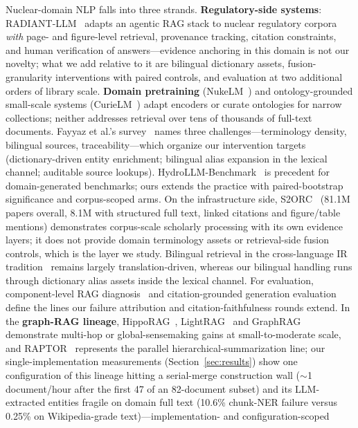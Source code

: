 \documentclass[sigconf,nonacm]{acmart}
\begin{document}
Nuclear-domain NLP falls into three strands. \textbf{Regulatory-side
systems}: RADIANT-LLM~\cite{radiantllm} adapts an agentic RAG stack to
nuclear regulatory corpora \emph{with} page- and figure-level retrieval,
provenance tracking, citation constraints, and human verification of
answers---evidence anchoring in this domain is not our novelty; what we
add relative to it are bilingual dictionary assets, fusion-granularity
interventions with paired controls, and evaluation at two additional
orders of library scale. \textbf{Domain pretraining}
(NukeLM~\cite{nukelm}) and ontology-grounded small-scale systems
(CurieLM~\cite{curielm}) adapt encoders or curate ontologies for narrow
collections; neither addresses retrieval over tens of thousands of
full-text documents. Fayyaz et al.'s survey~\cite{fayyaz} names three
challenges---terminology density, bilingual sources, traceability---which
organize our intervention targets (dictionary-driven entity enrichment;
bilingual alias expansion in the lexical channel; auditable source
lookups). HydroLLM-Benchmark~\cite{hydrollm} is precedent for
domain-generated benchmarks; ours extends the practice with
paired-bootstrap significance and corpus-scoped arms. On the
infrastructure side, S2ORC~\cite{s2orc} (81.1M papers overall, 8.1M with
structured full text, linked citations and figure/table mentions)
demonstrates corpus-scale scholarly processing with its own evidence
layers; it does not provide domain terminology assets or
retrieval-side fusion controls, which is the layer we study. Bilingual
retrieval in the cross-language IR tradition~\cite{clir} remains largely
translation-driven, whereas our bilingual handling runs through
dictionary alias assets inside the lexical channel. For evaluation,
component-level RAG diagnosis~\cite{ragchecker} and citation-grounded
generation evaluation~\cite{alce} define the lines our failure
attribution and citation-faithfulness rounds extend. In the
\textbf{graph-RAG lineage}, HippoRAG~\cite{hipporag},
LightRAG~\cite{lightrag} and GraphRAG~\cite{graphrag} demonstrate
multi-hop or global-sensemaking gains at small-to-moderate scale, and
RAPTOR~\cite{raptor} represents the parallel
hierarchical-summarization line; our single-implementation measurements
(Section~\ref{sec:results}) show one configuration of this lineage
hitting a serial-merge construction wall (${\sim}$1 document/hour after
the first 47 of an 82-document subset) and its LLM-extracted entities
fragile on domain full text (10.6\% chunk-NER failure versus 0.25\% on
Wikipedia-grade text)---implementation- and configuration-scoped
\end{document}
